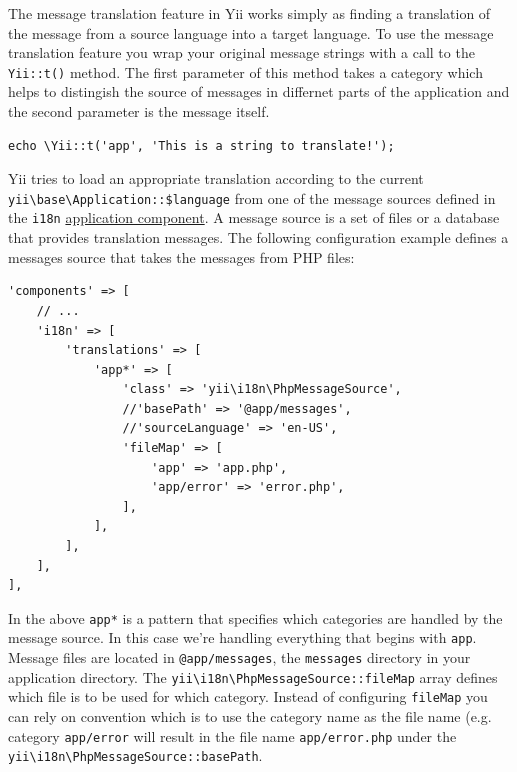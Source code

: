 The message translation feature in Yii works simply as finding a
translation of the message from a source language into a target language.
To use the message translation feature you wrap your original message strings with a call to the \texttt{Yii\allowbreak{}::\allowbreak{}t()} method.
The first parameter of this method takes a category which helps to distingish the source of messages in differnet parts
of the application and the second parameter is the message itself.

\lstset{language=php}\begin{lstlisting}
echo \Yii::t('app', 'This is a string to translate!');
\end{lstlisting}
Yii tries to load an appropriate translation according to the current \texttt{yii{\allowbreak{}\textbackslash}base{\allowbreak{}\textbackslash}Application\allowbreak{}::\allowbreak{}\$language}
from one of the message sources defined in the \lstinline|i18n| \hyperref[structure-application-components.md]{application component}.
A message source is a set of files or a database that provides translation messages.
The following configuration example defines a messages source that takes the messages from PHP files:

\lstset{language=php}\begin{lstlisting}
'components' => [
    // ...
    'i18n' => [
        'translations' => [
            'app*' => [
                'class' => 'yii\i18n\PhpMessageSource',
                //'basePath' => '@app/messages',
                //'sourceLanguage' => 'en-US',
                'fileMap' => [
                    'app' => 'app.php',
                    'app/error' => 'error.php',
                ],
            ],
        ],
    ],
],
\end{lstlisting}
In the above \lstinline|app*| is a pattern that specifies which categories are handled by the message source. In this case we're
handling everything that begins with \lstinline|app|. Message files are located in \lstinline|@app/messages|, the \lstinline|messages| directory
in your application directory. The \texttt{yii{\allowbreak{}\textbackslash}i18n{\allowbreak{}\textbackslash}PhpMessageSource\allowbreak{}::\allowbreak{}fileMap} array
defines which file is to be used for which category.
Instead of configuring \lstinline|fileMap| you can rely on convention which is to use the category name as the file name
(e.g. category \lstinline|app/error| will result in the file name \lstinline|app/error.php| under the \texttt{yii{\allowbreak{}\textbackslash}i18n{\allowbreak{}\textbackslash}PhpMessageSource\allowbreak{}::\allowbreak{}basePath}.

